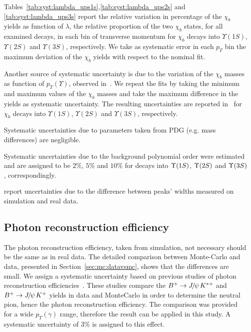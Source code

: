 Tables~\ref{tab:syst:lambda_ups1s},\ref{tab:syst:lambda_ups2s} and
\ref{tab:syst:lambda_ups3s} report the relative variation in percentage of the
$\chi_b$ yields as function of $\lambda$, the relative proportion of the two
$\chi_b$ states, for all examined decays, in each bin of transverse momentum
for $\chi_b$ decays into $\Upsilon(1S)$, $\Upsilon(2S)$ and $\Upsilon(3S)$,
respectively. We take as systematic error in each $p_T$ bin the maximum
deviation of the $\chi_b$ yields with respect to the nominal fit.

Another source of systematic uncertainty is due to the variation of the $\chi_b$ masses as
function of $p_T(\Upsilon)$, observed in~. We repeat the fits by
taking the minimum and maximum values of the $\chi_b$ masses and take the
maximum difference in the yields as systematic uncertainty. The resulting
uncertainties are reported
in~ for $\chi_b$
decays into $\Upsilon(1S)$, $\Upsilon(2S)$ and $\Upsilon(3S)$, respectively.
 
Systematic uncertainties due to parameters taken from PDG (e.g. mass differences)
are negligible.

Systematic uncertainties due to the background polynomial order were estimated and 
are assigned to be $2\%$, $5\%$ and $10\%$ for decays into $\Y1S$, $\Y2S$ and
$\Y3S$, correspondingly.

report uncertainties due to the difference between peaks' widths measured
on simulation and real data.



\subsection{Photon reconstruction efficiency}
The photon reconstruction efficiency, taken from simulation, not necessary 
should be the same as in real data. The detailed comparison between Monte-Carlo and data,
presented in Section~\ref{sec:mc:datavsmc}, shows that the differences are
small. We assign a systematic uncertainty based on previous studies of photon
reconstruction efficiencies~\cite{Belyaev:1411344}. These studies compare the
$B^+ \to \jpsi K^{*+}$ and $B^+ \to \jpsi K^+$ yields in data and MonteCarlo in
order to determine the neutral pion, hence the photon  reconstruction
efficiency. The comparison was provided for a wide $p_T(\gamma)$ range, therefore
the result can be applied in this study. A systematic uncertainty of 3\%
is assigned to this effect.



